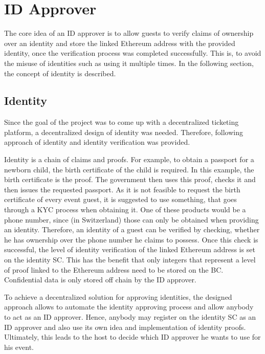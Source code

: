\section{ID Approver}\label{section:id-approver-design}

The core idea of an ID approver is to allow guests to verify claims of ownership over an identity and store the linked Ethereum address with the provided identity, once the verification process was completed successfully. This is, to avoid the misuse of identities such as using it multiple times. In the following section, the concept of identity is described.

\subsection{Identity}\label{design:identity}
Since the goal of the project was to come up with a decentralized ticketing platform, a decentralized design of identity was needed. Therefore, following approach of identity and identity verification was provided.

Identity is a chain of claims and proofs. For example, to obtain a passport for a newborn child, the birth certificate of the child is required. In this example, the birth certificate is the proof. The government then uses this proof, checks it and then issues the requested passport. As it is not feasible to request the birth certificate of every event guest, it is suggested to use something, that goes through a KYC process when obtaining it. One of these products would be a phone number, since (in Switzerland) those can only be obtained when providing an identity. Therefore, an identity of a guest can be verified by checking, whether he has ownership over the phone number he claims to possess. Once this check is successful, the level of identity verification of the linked Ethereum address is set on the identity SC. This has the benefit that only integers that represent a level of proof linked to the Ethereum address need to be stored on the BC. Confidential data is only stored off chain by the ID approver.

To achieve a decentralized solution for approving identities, the designed approach allows to automate the identity approving process and allow anybody to act as an ID approver. Hence, anybody may register on the identity SC as an ID approver and also use its own idea and implementation of identity proofs.
Ultimately, this leads to the host to decide which ID approver he wants to use for his event.


